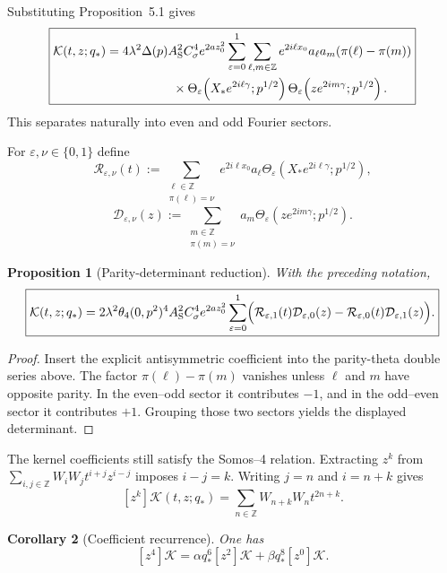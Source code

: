 \documentclass[11pt]{article}
\newtheorem{proposition}{Proposition}[section]
\newtheorem{corollary}[proposition]{Corollary}
\numberwithin{equation}{section}
\begin{document}
Substituting Proposition~5.1 gives
\begin{equation}
\boxed{
\begin{aligned}
\mathcal K(t,z;q_\ast)
={}&4\lambda^2\Delta(p)A_{\rm S}^2C_\sigma^4e^{2az_0^2}
\sum_{\varepsilon=0}^1\sum_{\ell,m\in\mathbb Z}
 e^{2i\ell x_0}a_\ell a_m(\pi(\ell)-\pi(m))\\
&\qquad\qquad\times
\Theta_\varepsilon\!\left(X_\ast e^{2i\ell\gamma};p^{1/2}\right)
\Theta_\varepsilon\!\left(ze^{2im\gamma};p^{1/2}\right).
\end{aligned}}
\end{equation}
This separates naturally into even and odd Fourier sectors.

For $\varepsilon,\nu\in\{0,1\}$ define
\begin{equation}
\boxed{
\mathcal R_{\varepsilon,\nu}(t):=
\sum_{\substack{\ell\in\mathbb Z\\\pi(\ell)=\nu}}
e^{2i\ell x_0}a_\ell
\Theta_\varepsilon\!\left(X_\ast e^{2i\ell\gamma};p^{1/2}\right),}
\end{equation}
\begin{equation}
\boxed{
\mathcal D_{\varepsilon,\nu}(z):=
\sum_{\substack{m\in\mathbb Z\\\pi(m)=\nu}}
a_m
\Theta_\varepsilon\!\left(ze^{2im\gamma};p^{1/2}\right).}
\end{equation}

\begin{proposition}[Parity-determinant reduction]
With the preceding notation,
\begin{equation}
\boxed{
\mathcal K(t,z;q_\ast)
=2\lambda^2\theta_4(0,p^2)^4A_{\rm S}^2C_\sigma^4e^{2az_0^2}
\sum_{\varepsilon=0}^1
\Bigl(
\mathcal R_{\varepsilon,1}(t)\mathcal D_{\varepsilon,0}(z)
-\mathcal R_{\varepsilon,0}(t)\mathcal D_{\varepsilon,1}(z)
\Bigr).}
\end{equation}
\end{proposition}

\begin{proof}
Insert the explicit antisymmetric coefficient into the parity-theta double series above.  The factor $\pi(\ell)-\pi(m)$ vanishes unless $\ell$ and $m$ have opposite parity.  In the even--odd sector it contributes $-1$, and in the odd--even sector it contributes $+1$.  Grouping those two sectors yields the displayed determinant.
\end{proof}

The kernel coefficients still satisfy the Somos--4 relation.  Extracting
$z^k$ from $\sum_{i,j\in\mathbb Z}W_iW_jt^{i+j}z^{i-j}$ imposes
$i-j=k$.  Writing $j=n$ and $i=n+k$ gives
\begin{equation}
\boxed{
[z^k]\mathcal K(t,z;q_\ast)
=\sum_{n\in\mathbb Z}W_{n+k}W_n t^{2n+k}.}
\end{equation}
\begin{corollary}[Coefficient recurrence]
One has
\begin{equation}
\boxed{
[z^4]\mathcal K
=\alpha q_\ast^6[z^2]\mathcal K
+\beta q_\ast^8[z^0]\mathcal K.}
\end{equation}
\end{corollary}
\end{document}
